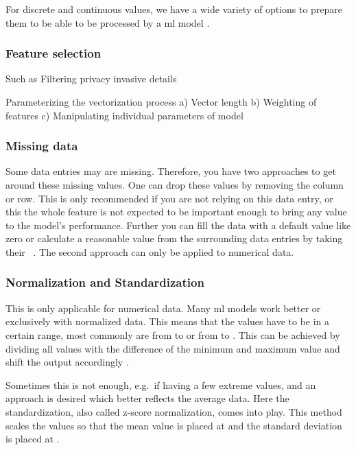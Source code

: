 For discrete and continuous values, we have a wide variety of options to prepare them to be able to be processed by a \gls{ml} model \cite{duong2021}.


\subsubsection{Feature selection}
Such as Filtering privacy invasive details

Parameterizing the vectorization process
a) Vector length
b) Weighting of features
c) Manipulating individual parameters of model

\subsubsection{Missing data}
Some data entries may are missing.
Therefore, you have two approaches to get around these missing values.
One can drop these values by removing the column or row.
This is only recommended if you are not relying on this data entry, or this the whole feature is not expected to be important enough to bring any value to the model's performance.
Further you can fill the data with a default value like zero or calculate a reasonable value from the surrounding data entries by taking their ~\cite{duong2021}.
The second approach can only be applied to numerical data.

\subsubsection{Normalization and Standardization}

This is only applicable for numerical data.
Many \gls{ml} models work better or exclusively with normalized data.
This means that the values have to be in a certain range, most commonly are from  to  or from  to .
This can be achieved by dividing all values with the difference of the minimum and maximum value and shift the output accordingly \cite{duong2021}.


Sometimes this is not enough, e.g.\ if having a few extreme values, and an approach is desired which better reflects the average data.
Here the standardization, also called z-score normalization, comes into play.
This method scales the values so that the mean value is placed at  and the standard deviation is placed at .
